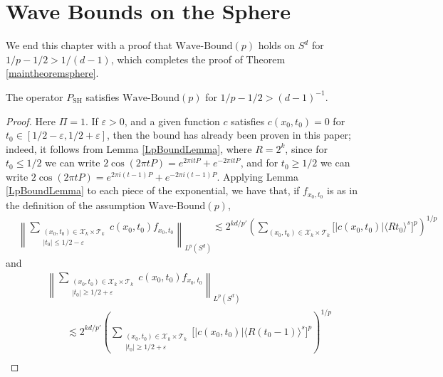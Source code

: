 \section{Wave Bounds on the Sphere}

We end this chapter with a proof that $\text{Wave-Bound}(p)$ holds on $S^d$ for $1/p - 1/2 > 1/(d-1)$, which completes the proof of Theorem \ref{maintheoremsphere}.

\begin{lemma}
    The operator $P_{\text{SH}}$ satisfies $\text{Wave-Bound}(p)$ for $1/p - 1/2 > (d-1)^{-1}$.
\end{lemma}
\begin{proof}
    Here $\Pi = 1$. If $\varepsilon > 0$, and a given function $c$ satisfies $c(x_0,t_0) = 0$ for $t_0 \in [1/2 - \varepsilon, 1/2 + \varepsilon]$, then the bound has already been proven in this paper; indeed, it follows from Lemma \ref{LpBoundLemma}, where $R = 2^k$, since for $t_0 \leq 1/2$ we can write $2 \cos(2 \pi t P) = e^{2 \pi i t P} + e^{-2 \pi i t P}$, and for $t_0 \geq 1/2$ we can write $2 \cos(2 \pi t P) = e^{2 \pi i (t - 1) P} + e^{-2 \pi i (t - 1) P}$. Applying Lemma \ref{LpBoundLemma} to each piece of the exponential, we have that, if $f_{x_0,t_0}$ is as in the definition of the assumption $\text{Wave-Bound}(p)$,
    \begin{equation}
    \begin{split}
        &\left\| \sum\nolimits_{\substack{(x_0,t_0) \in \mathcal{X}_k \times \mathcal{T}_k\\|t_0| \leq 1/2 - \varepsilon}} c(x_0,t_0) f_{x_0,t_0} \right\|_{L^p(S^d)} \lesssim 2^{kd/p'} \left( \sum\nolimits_{(x_0,t_0) \in \mathcal{X}_k \times \mathcal{T}_k} \Big[ |c(x_0,t_0)| \langle R t_0 \rangle^{s} \Big]^p \right)^{1/p}
    \end{split}
    \end{equation}
    and
    \begin{equation}
    \begin{split}
        &\left\| \sum\nolimits_{\substack{(x_0,t_0) \in \mathcal{X}_k \times \mathcal{T}_k\\|t_0| \geq 1/2 + \varepsilon}} c(x_0,t_0) f_{x_0,t_0} \right\|_{L^p(S^d)} \\
        &\quad\quad \lesssim 2^{kd/p'} \left( \sum\nolimits_{\substack{(x_0,t_0) \in \mathcal{X}_k \times \mathcal{T}_k\\|t_0| \geq 1/2 + \varepsilon}} \Big[ |c(x_0,t_0)| \langle R (t_0 - 1) \rangle^{s} \Big]^p \right)^{1/p}\\

\end{split}
\end{equation}
\end{proof}
